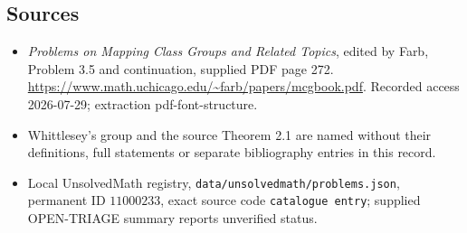 \documentclass[11pt]{article}
\begin{document}
\subsection{Sources}
\begin{itemize}
\item \emph{Problems on Mapping Class Groups and Related Topics}, edited by Farb, Problem 3.5 and continuation, supplied PDF page 272. \url{https://www.math.uchicago.edu/~farb/papers/mcgbook.pdf}. Recorded access 2026-07-29; extraction pdf-font-structure.
\item Whittlesey's group and the source Theorem 2.1 are named without their definitions, full statements or separate bibliography entries in this record.
\item Local UnsolvedMath registry, \texttt{data/unsolvedmath/problems.json}, permanent ID \(11000233\), exact source code \texttt{catalogue entry}; supplied OPEN-TRIAGE summary reports unverified status.
\end{itemize}
\end{document}

